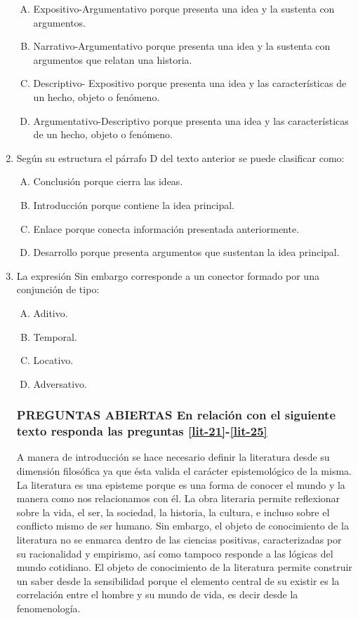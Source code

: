 \begin{enumerate}
\begin{enumerate}[(A)]
\item  Expositivo-Argumentativo porque presenta una idea y la sustenta con argumentos.
\item   Narrativo-Argumentativo porque presenta una idea y la sustenta con argumentos que relatan una historia. 
\item  Descriptivo- Expositivo porque presenta una idea y las características de un hecho, objeto o fenómeno.
\item  Argumentativo-Descriptivo porque presenta una idea y las características de un hecho, objeto o fenómeno.
\end{enumerate}
\item Según su estructura el párrafo D del texto anterior se puede clasificar como:\label{lit-19}

\begin{enumerate}[(A)]
\item  Conclusión porque cierra las ideas.
\item  Introducción porque contiene la idea principal.
\item  Enlace porque conecta información presentada anteriormente.
\item  Desarrollo porque presenta argumentos que sustentan la idea principal.
\end{enumerate}
\item  La expresión Sin embargo corresponde a un conector formado por una conjunción de tipo: \label{lit-20}


\begin{enumerate}[(A)]
\item  Aditivo.
\item  Temporal.
\item  Locativo.
\item  Adversativo.
\end{enumerate}

\subsubsection*{\textbf{PREGUNTAS ABIERTAS}
En relación con el siguiente texto responda las preguntas \ref{lit-21}-\ref{lit-25}}

A manera de introducción se hace necesario definir la literatura desde su dimensión filosófica ya que ésta valida el carácter epistemológico de la misma. La literatura es una episteme porque es una forma de conocer el mundo y la manera como nos relacionamos con él. La obra literaria permite reflexionar sobre la vida, el ser, la sociedad, la historia, la cultura, e incluso sobre el conflicto mismo de ser humano. Sin embargo, el objeto de conocimiento de la literatura no se enmarca dentro de las ciencias positivas,  caracterizadas por su racionalidad y empirismo, así como tampoco responde a las lógicas del mundo cotidiano. El objeto de conocimiento de la literatura permite construir un saber desde la sensibilidad  porque el elemento central  de su existir es la correlación entre el hombre y su mundo de vida, es decir desde la fenomenología.



\end{enumerate}
